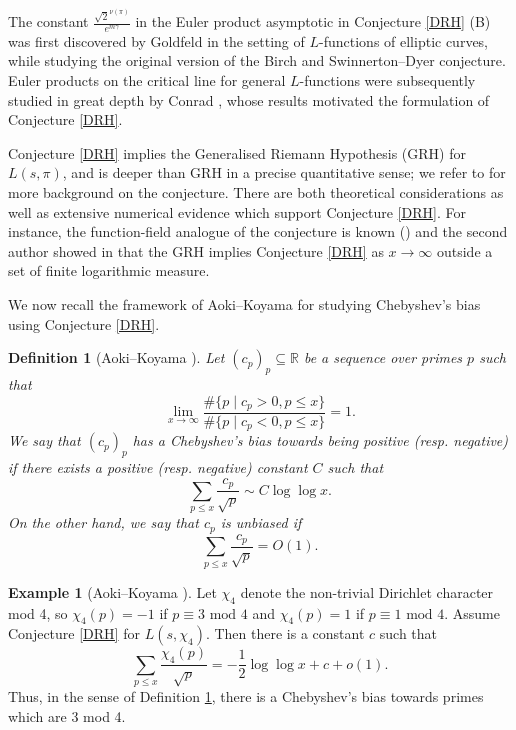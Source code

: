 \documentclass[12pt,reqno]{amsart}
\newtheorem{definition}[theorem]{Definition}
\theoremstyle{definition}
\newtheorem{example}[theorem]{Example}
\numberwithin{equation}{section}
\newcommand{\R}{\mathbb{R}}
\begin{document}
The constant $\frac{\sqrt{2}^{ \nu (\pi) }}{e^{m \gamma}}$ in the Euler product asymptotic in Conjecture \ref{DRH} (B) was first discovered by Goldfeld \cite{Goldfeld1982} in the setting of $L$-functions of elliptic curves, while studying the original version of the Birch and Swinnerton--Dyer conjecture. Euler products on the critical line for general $L$-functions were subsequently studied in great depth by Conrad \cite{Conrad2005}, whose results motivated the formulation of Conjecture \ref{DRH}. 

Conjecture \ref{DRH} implies the Generalised Riemann Hypothesis (GRH) for $L(s, \pi)$, and is deeper than GRH in a precise quantitative sense; we refer to \cite{KanekoKoyamaKurokawa2022} for more background on the conjecture. There are both theoretical considerations as well as extensive numerical evidence which support Conjecture \ref{DRH}. For instance, the function-field analogue of the conjecture is known (\cite[Theorem 5.2]{KanekoKoyamaKurokawa2022}) and the second author showed in \cite{Sheth24B} that the GRH implies Conjecture \ref{DRH} as $x \to \infty$ outside a set of finite logarithmic measure. 


We now recall the framework of Aoki--Koyama \cite{AokiKoyama2023} for studying Chebyshev's bias using Conjecture \ref{DRH}. 

\begin{definition}[Aoki--Koyama \cite{AokiKoyama2023}] \label{Chebyshev}
Let $(c_p)_p \subseteq \R$ be a sequence over primes $p$  such that
$$
\lim_{x \to \infty} \frac{\#\{p \mid c_p > 0,  p \leq x \}}{\#\{p \mid c_p < 0,  p \leq x \}} = 1.
$$
We say that $(c_p)_p$ has a \textit{Chebyshev's bias towards being positive} (resp. negative) if there exists a positive (resp. negative) constant $C$ such that 
\begin{equation*}
\sum_{p \leqslant x} \frac{c_p}{\sqrt p} \sim C \log \log x.\end{equation*}  On the other hand, we say that $c_p$ is \textit{unbiased} if
\begin{equation*}
\displaystyle{\sum_{p \leq x} \frac{c_p}{\sqrt p } = O(1)}. 
\end{equation*} 
\end{definition}

\begin{example}[{Aoki--Koyama \cite[Example 3.4]{AokiKoyama2023}}]
Let $\chi_4$ denote the non-trivial Dirichlet character mod 4, so $\chi_4(p)=-1$ if $p \equiv 3 \textrm{ mod } 4$ and $\chi_4(p)=1$ if $p \equiv 1 \textrm{ mod } 4$. Assume Conjecture \ref{DRH} for $L(s, \chi_4)$.
Then there is a constant $c$ such that
$$
\sum_{p \leqslant x} \frac{\chi_4(p)}{\sqrt p}= -\frac{1}{2} \log \log x+ c+ o(1). 
$$
Thus, in the sense of Definition \ref{Chebyshev}, there is a Chebyshev's bias towards primes which are 3 mod 4. 
\end{example}
\end{document}

